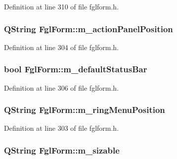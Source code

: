 Definition at line 310 of file fglform.h.

\hypertarget{classFglForm_af3882d981d23db8e6dca26a44ac23051}{
\subsubsection[{m\_\-actionPanelPosition}]{\setlength{\rightskip}{0pt plus 5cm}QString {\bf FglForm::m\_\-actionPanelPosition}}}
\label{classFglForm_af3882d981d23db8e6dca26a44ac23051}


Definition at line 304 of file fglform.h.

\hypertarget{classFglForm_a2e877386e4ba441d929c0c35d48620cb}{
\subsubsection[{m\_\-defaultStatusBar}]{\setlength{\rightskip}{0pt plus 5cm}bool {\bf FglForm::m\_\-defaultStatusBar}}}
\label{classFglForm_a2e877386e4ba441d929c0c35d48620cb}


Definition at line 306 of file fglform.h.

\hypertarget{classFglForm_a25371a3df6cb3e1dc66e141bb2a9dff1}{
\subsubsection[{m\_\-ringMenuPosition}]{\setlength{\rightskip}{0pt plus 5cm}QString {\bf FglForm::m\_\-ringMenuPosition}}}
\label{classFglForm_a25371a3df6cb3e1dc66e141bb2a9dff1}


Definition at line 303 of file fglform.h.

\hypertarget{classFglForm_a7861c07caeb306c5ae9f2012ce73bff7}{
\subsubsection[{m\_\-sizable}]{\setlength{\rightskip}{0pt plus 5cm}QString {\bf FglForm::m\_\-sizable}}}
\label{classFglForm_a7861c07caeb306c5ae9f2012ce73bff7}


